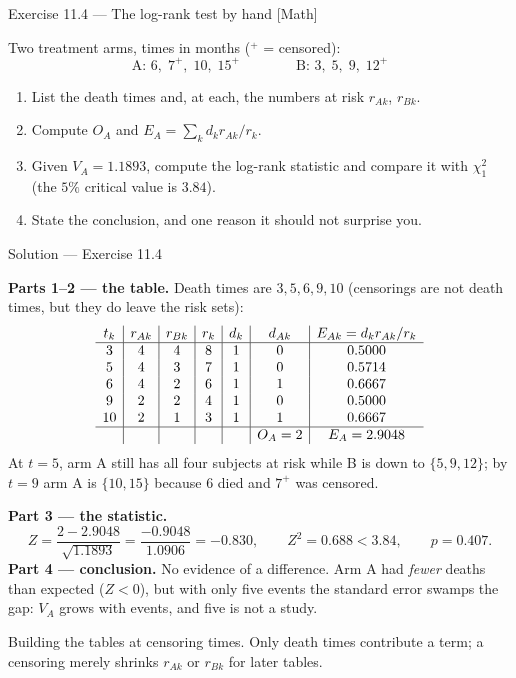 \documentclass[aspectratio=169,11pt]{beamer}
\begin{document}
\begin{frame}{Exercise 11.4 --- The log-rank test by hand [Math]}
\begin{exercise}
  Two treatment arms, times in months ($^{+}$ = censored):
  \[
    \text{A: } 6,\; 7^{+},\; 10,\; 15^{+}
    \qquad\qquad
    \text{B: } 3,\; 5,\; 9,\; 12^{+}
  \]
  \begin{enumerate}
    \item List the death times and, at each, the numbers at risk $r_{Ak}$, $r_{Bk}$.
    \item Compute $O_A$ and $E_A=\sum_k d_k r_{Ak}/r_k$.
    \item Given $V_A=1.1893$, compute the log-rank statistic and compare it with
          $\chi^2_1$ (the $5\%$ critical value is $3.84$).
    \item State the conclusion, and one reason it should not surprise you.
  \end{enumerate}
\end{exercise}
\end{frame}

\begin{frame}{Solution --- Exercise 11.4}
  \scriptsize
\begin{solutionbox}
  \tiny
  \textbf{Parts 1--2 --- the table.} Death times are $3,5,6,9,10$ (censorings are not
  death times, but they do leave the risk sets):
  \[
    \begin{array}{c|c|c|c|c|c|c}
      t_k & r_{Ak} & r_{Bk} & r_k & d_k & d_{Ak} & E_{Ak}=d_k r_{Ak}/r_k\\ \hline
      3  & 4 & 4 & 8 & 1 & 0 & 0.5000\\
      5  & 4 & 3 & 7 & 1 & 0 & 0.5714\\
      6  & 4 & 2 & 6 & 1 & 1 & 0.6667\\
      9  & 2 & 2 & 4 & 1 & 0 & 0.5000\\
      10 & 2 & 1 & 3 & 1 & 1 & 0.6667\\ \hline
         &   &   &   &   & O_A=2 & E_A=2.9048
    \end{array}
  \]
  At $t=5$, arm A still has all four subjects at risk while B is down to $\{5,9,12\}$;
  by $t=9$ arm A is $\{10,15\}$ because $6$ died and $7^{+}$ was censored.

  \medskip
  \textbf{Part 3 --- the statistic.}
  \[
    Z=\frac{2-2.9048}{\sqrt{1.1893}}=\frac{-0.9048}{1.0906}=-0.830,
    \qquad Z^2=0.688 < 3.84,\qquad p=0.407 .
  \]
  \textbf{Part 4 --- conclusion.} No evidence of a difference. Arm A had \emph{fewer}
  deaths than expected ($Z<0$), but with only five events the standard error swamps the
  gap: $V_A$ grows with events, and five is not a study.
\end{solutionbox}
\begin{mistake}
  \scriptsize
  Building the tables at censoring times. Only death times contribute a term; a censoring
  merely shrinks $r_{Ak}$ or $r_{Bk}$ for later tables.
\end{mistake}
\end{frame}
\end{document}
